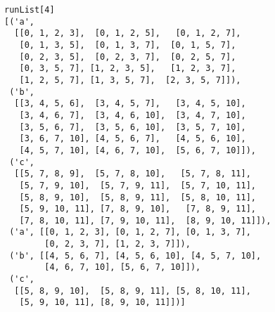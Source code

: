 \begin{verbatim}
runList[4]
[('a',
  [[0, 1, 2, 3],  [0, 1, 2, 5],   [0, 1, 2, 7],
   [0, 1, 3, 5],  [0, 1, 3, 7],  [0, 1, 5, 7],
   [0, 2, 3, 5],  [0, 2, 3, 7],  [0, 2, 5, 7],
   [0, 3, 5, 7], [1, 2, 3, 5],   [1, 2, 3, 7],
   [1, 2, 5, 7], [1, 3, 5, 7],  [2, 3, 5, 7]]),
 ('b',
  [[3, 4, 5, 6],  [3, 4, 5, 7],   [3, 4, 5, 10],
   [3, 4, 6, 7],  [3, 4, 6, 10],  [3, 4, 7, 10],
   [3, 5, 6, 7],  [3, 5, 6, 10],  [3, 5, 7, 10],
   [3, 6, 7, 10], [4, 5, 6, 7],   [4, 5, 6, 10],
   [4, 5, 7, 10], [4, 6, 7, 10],  [5, 6, 7, 10]]),
 ('c',
  [[5, 7, 8, 9],  [5, 7, 8, 10],   [5, 7, 8, 11],
   [5, 7, 9, 10],  [5, 7, 9, 11],  [5, 7, 10, 11],
   [5, 8, 9, 10],  [5, 8, 9, 11],  [5, 8, 10, 11],
   [5, 9, 10, 11], [7, 8, 9, 10],   [7, 8, 9, 11],
   [7, 8, 10, 11], [7, 9, 10, 11],  [8, 9, 10, 11]]),
 ('a', [[0, 1, 2, 3], [0, 1, 2, 7], [0, 1, 3, 7], 
        [0, 2, 3, 7], [1, 2, 3, 7]]),
 ('b', [[4, 5, 6, 7], [4, 5, 6, 10], [4, 5, 7, 10], 
        [4, 6, 7, 10], [5, 6, 7, 10]]),
 ('c',
  [[5, 8, 9, 10],  [5, 8, 9, 11], [5, 8, 10, 11],
   [5, 9, 10, 11], [8, 9, 10, 11]])]

\end{verbatim}
